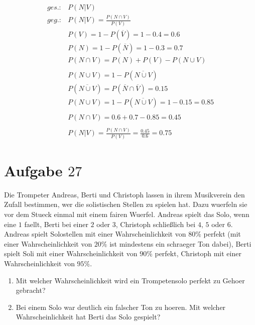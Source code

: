 \documentclass[]{article}
\begin{document}
\begin{equation}
	\begin{split}
		ges.: & P(N \vert V) \\
		geg.: & P(N \vert V) = \frac{P(N \cap V)}{P(V)} \\
		& P(V) = 1 - P(\overline{V}) = 1 - 0.4 = 0.6 \\
		& P(N) = 1 - P(\overline{N}) = 1 - 0.3 = 0.7 \\
		& P(N \cap V) = P(N) + P(V) - P(N \cup V) \\
		& \\
		& P(N \cup V) = 1 - P(\overline{N \cup V}) \\
		& P(\overline{N \cup V}) = P(\overline{N} \cap \overline{V}) = 0.15 \\
		& P(N \cup V) = 1 - P(\overline{N \cup V}) = 1 - 0.15 = 0.85 \\
		& \\
		& P(N \cap V) = 0.6 + 0.7 - 0.85 = 0.45 \\
		& \\
		& P(N \vert V) = \frac{P(N \cap V)}{P(V)} = \frac{0.45}{0.6} = 0.75
	\end{split}
\end{equation}

\section{Aufgabe $27$}

Die Trompeter Andreas, Berti und Christoph lassen in ihrem Musikverein den Zufall bestimmen, wer die solistischen Stellen zu spielen hat. Dazu wuerfeln sie vor dem Stueck einmal mit einem fairen Wuerfel. Andreas spielt das Solo, wenn eine $1$ faellt, Berti bei einer $2$ oder $3$, Christoph schließlich bei $4$, $5$ oder $6$. \\
Andreas spielt Solostellen mit einer Wahrscheinlichkeit von $80\%$ perfekt (mit einer Wahrscheinlichkeit von $20\%$ ist mindestens ein schraeger Ton dabei), Berti spielt Soli mit einer Wahrscheinlichkeit von $90\%$ perfekt, Christoph mit einer Wahrscheinlichkeit von $95\%$. 

\begin{enumerate}[label=\alph*)]
	\item Mit welcher Wahrscheinlichkeit wird ein Trompetensolo perfekt zu Gehoer gebracht? 
	\item Bei einem Solo war deutlich ein falscher Ton zu hoeren. Mit welcher Wahrscheinlichkeit hat Berti das Solo gespielt? 
\end{enumerate}
\end{document}
